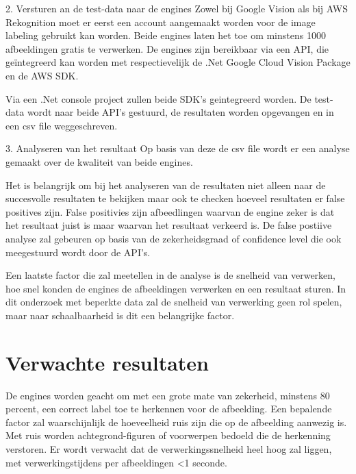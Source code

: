 2. Versturen an de test-data naar de engines
\linebreak
Zowel bij Google Vision als bij AWS Rekognition moet er eerst een account aangemaakt worden voor de image labeling gebruikt kan worden. Beide engines laten het toe om minstens 1000 afbeeldingen gratis te verwerken. De engines zijn bereikbaar via een API, die geïntegreerd kan worden met respectievelijk de .Net Google Cloud Vision Package en de AWS SDK.

Via een .Net console project zullen beide SDK's geintegreerd worden. De test-data wordt naar beide API's gestuurd, de resultaten worden opgevangen en in een csv file weggeschreven.

3. Analyseren van het resultaat
\linebreak
Op basis van deze de csv file wordt er een analyse gemaakt over de kwaliteit van beide engines.

Het is belangrijk om bij het analyseren van de resultaten niet alleen naar de succesvolle resultaten te bekijken maar ook te checken hoeveel resultaten er false positives zijn. False positivies zijn afbeedlingen waarvan de engine zeker is dat het resultaat juist is maar waarvan het resultaat verkeerd is.
De false postiive analyse zal gebeuren op basis van de zekerheidsgraad of confidence level die ook meegestuurd wordt door de API's.

Een laatste factor die zal meetellen in de analyse is de snelheid van verwerken, hoe snel konden de engines de afbeeldingen verwerken en een resultaat sturen. In dit onderzoek met beperkte data zal de snelheid van verwerking geen rol spelen, maar naar schaalbaarheid is dit een belangrijke factor.

\section{Verwachte resultaten}
\label{sec:verwachte_resultaten}
De engines worden geacht om met een grote mate van zekerheid, minstens 80 percent, een correct label toe te herkennen voor de afbeelding. Een bepalende factor zal waarschijnlijk de hoeveelheid ruis zijn die op de afbeelding aanwezig is. Met ruis worden achtegrond-figuren of voorwerpen bedoeld die de herkenning verstoren.
Er wordt verwacht dat de verwerkingssnelheid heel hoog zal liggen, met verwerkingstijdens per afbeeldingen <1 seconde.


